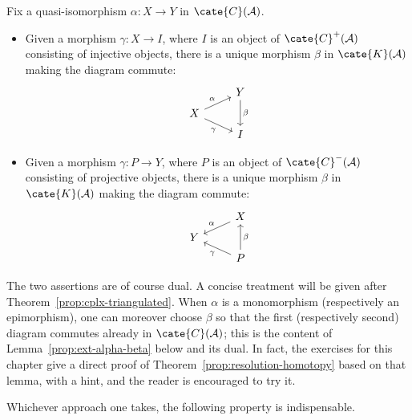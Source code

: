 \begin{theorem}\label{prop:resolution-homotopy}
	Fix a quasi-isomorphism $\alpha:X\to Y$ in $\cate{C}(\mathcal{A})$.
	\begin{itemize}
		\item Given a morphism $\gamma:X\to I$, where $I$ is an object of
		$\cate{C}^+(\mathcal{A})$ consisting of injective objects, there is a
		unique morphism $\beta$ in $\cate{K}(\mathcal{A})$ making the diagram
		commute:
		\[\begin{tikzcd}[row sep=tiny]
			& Y \arrow[dd, "\beta"] \\
			X \arrow[ru, "\alpha"] \arrow[rd, "\gamma"'] & \\
			& I
		\end{tikzcd}\]
		\item Given a morphism $\gamma:P\to Y$, where $P$ is an object of
		$\cate{C}^-(\mathcal{A})$ consisting of projective objects, there is a
		unique morphism $\beta$ in $\cate{K}(\mathcal{A})$ making the diagram
		commute:
		\[\begin{tikzcd}[row sep=tiny]
			& X \arrow[ld, "\alpha"'] \\
			Y & \\
			& P \arrow[lu, "\gamma"] \arrow[uu, "\beta"']
		\end{tikzcd}\]
	\end{itemize}
\end{theorem}

The two assertions are of course dual. A concise treatment will be given after
Theorem~\ref{prop:cplx-triangulated}. When $\alpha$ is a monomorphism
(respectively an epimorphism), one can moreover choose $\beta$ so that the
first (respectively second) diagram commutes already in
$\cate{C}(\mathcal{A})$; this is the content of
Lemma~\ref{prop:ext-alpha-beta} below and its dual. In fact, the exercises for
this chapter give a direct proof of Theorem~\ref{prop:resolution-homotopy}
based on that lemma, with a hint, and the reader is encouraged to try it.

Whichever approach one takes, the following property is indispensable.

